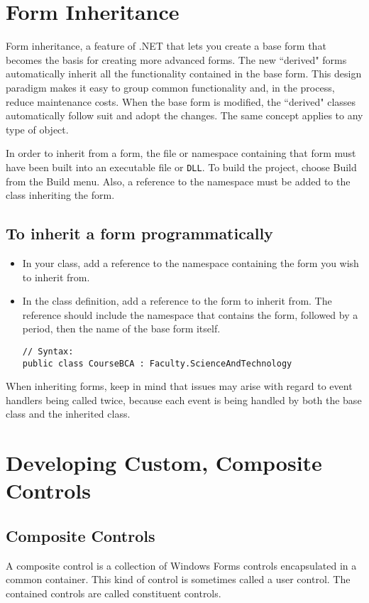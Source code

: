 \section{Form Inheritance}
Form inheritance, a feature of .NET that lets you create a base form that becomes the basis for
creating more advanced forms. The new ``derived" forms automatically inherit all the
functionality contained in the base form. This design paradigm makes it easy to group common
functionality and, in the process, reduce maintenance costs. When the base form is modified, the
``derived" classes automatically follow suit and adopt the changes. The same concept applies to any
type of object.

In order to inherit from a form, the file or namespace containing that form must have been
built into an executable file or \texttt{DLL}. To build the project, choose Build from the Build menu. Also, a reference to the namespace must be added to the class inheriting the form.

\subsection*{To inherit a form programmatically}
\begin{itemize}
\item In your class, add a reference to the namespace containing the form you wish to inherit from.
	
\item In the class definition, add a reference to the form to inherit from. The reference should include the namespace that contains the form, followed by a period, then the name of the base form itself.
	
\begin{lstlisting}[numbers=none]
// Syntax: 
public class CourseBCA : Faculty.ScienceAndTechnology
\end{lstlisting}
	
\end{itemize}
When inheriting forms, keep in mind that issues may arise with regard to event handlers being
called twice, because each event is being handled by both the base class and the inherited class.

\section{Developing Custom, Composite Controls}

\subsection*{Composite Controls}
A composite control is a collection of Windows Forms controls encapsulated in a common container. This kind of control is sometimes called a user control. The contained controls are called constituent controls.


